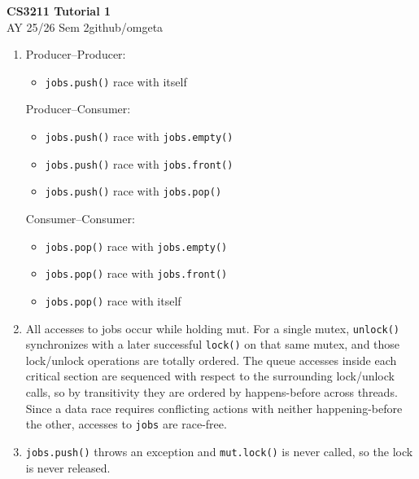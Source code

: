 \documentclass[12pt, a4paper]{article}
\newcommand{\mytitle}{CS3211 Tutorial 1}
\newcommand{\myauthor}{github/omgeta}
\newcommand{\mydate}{AY 25/26 Sem 2}
\begin{document}
\raggedright
\footnotesize
\begin{center}
{\normalsize{\textbf{\mytitle}}} \\
{\footnotesize{\mydate\hspace{2pt}\textemdash\hspace{2pt}\myauthor}}
\end{center}
\begin{enumerate}[Q\arabic*.]
  \item Producer--Producer:
    \begin{itemize}
      \item \lstinline|jobs.push()| race with itself
    \end{itemize}
    Producer--Consumer:
    \begin{itemize}
      \item \lstinline|jobs.push()| race with \lstinline|jobs.empty()|
      \item \lstinline|jobs.push()| race with \lstinline|jobs.front()|
      \item \lstinline|jobs.push()| race with \lstinline|jobs.pop()|
    \end{itemize}
    Consumer--Consumer:
    \begin{itemize}
      \item \lstinline|jobs.pop()| race with \lstinline|jobs.empty()|
      \item \lstinline|jobs.pop()| race with \lstinline|jobs.front()|
      \item \lstinline|jobs.pop()| race with itself
    \end{itemize}

  \item All accesses to jobs occur while holding mut. For a single mutex, \lstinline|unlock()| synchronizes with a later successful \lstinline|lock()| on that same mutex, and those lock/unlock operations are totally ordered. The queue accesses inside each critical section are sequenced with respect to the surrounding lock/unlock calls, so by transitivity they are ordered by happens-before across threads. Since a data race requires conflicting actions with neither happening-before the other, accesses to \lstinline|jobs| are race-free.

  \item \lstinline|jobs.push()| throws an exception and \lstinline|mut.lock()| is never called, so the lock is never released.


\end{enumerate}
\end{document}

